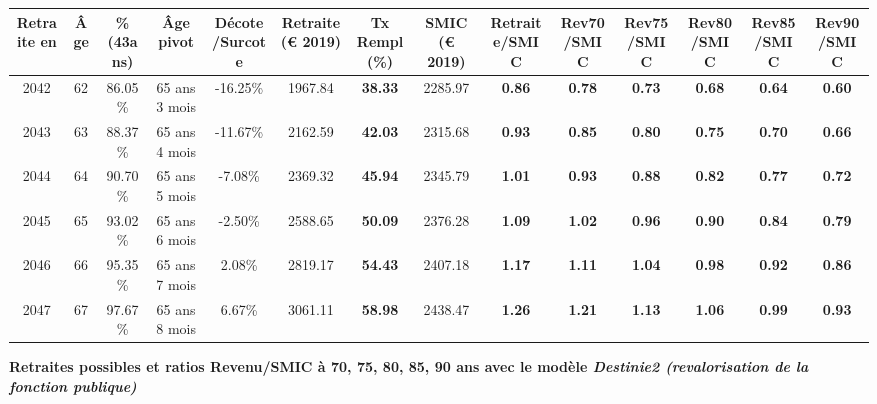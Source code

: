 \begin{adjustbox}{max width=\textwidth} 
\begin{tabular}[htb]{|c|c||c|c|c||c|c||c||c|c|c|c|c|c|} 
\hline 
 Retraite en &  Âge &  \%(43ans) &  Âge pivot &  Décote/Surcote &  Retraite (\euro{} 2019) &  Tx Rempl(\%) &  SMIC (\euro{} 2019) &  Retraite/SMIC &  Rev70/SMIC &  Rev75/SMIC &  Rev80/SMIC &  Rev85/SMIC &  Rev90/SMIC \\ 
\hline \hline 
 2042 &  62 &  86.05\% &  65 ans 3 mois &  -16.25\% &  1967.84 &  {\bf 38.33} &  2285.97 &  {\bf {\color{red} 0.86}} &  {\bf {\color{red} 0.78}} &  {\bf {\color{red} 0.73}} &  {\bf {\color{red} 0.68}} &  {\bf {\color{red} 0.64}} &  {\bf {\color{red} 0.60}} \\ 
\hline 
 2043 &  63 &  88.37\% &  65 ans 4 mois &  -11.67\% &  2162.59 &  {\bf 42.03} &  2315.68 &  {\bf {\color{red} 0.93}} &  {\bf {\color{red} 0.85}} &  {\bf {\color{red} 0.80}} &  {\bf {\color{red} 0.75}} &  {\bf {\color{red} 0.70}} &  {\bf {\color{red} 0.66}} \\ 
\hline 
 2044 &  64 &  90.70\% &  65 ans 5 mois &  -7.08\% &  2369.32 &  {\bf 45.94} &  2345.79 &  {\bf 1.01} &  {\bf {\color{red} 0.93}} &  {\bf {\color{red} 0.88}} &  {\bf {\color{red} 0.82}} &  {\bf {\color{red} 0.77}} &  {\bf {\color{red} 0.72}} \\ 
\hline 
 2045 &  65 &  93.02\% &  65 ans 6 mois &  -2.50\% &  2588.65 &  {\bf 50.09} &  2376.28 &  {\bf 1.09} &  {\bf 1.02} &  {\bf {\color{red} 0.96}} &  {\bf {\color{red} 0.90}} &  {\bf {\color{red} 0.84}} &  {\bf {\color{red} 0.79}} \\ 
\hline 
 2046 &  66 &  95.35\% &  65 ans 7 mois &  2.08\% &  2819.17 &  {\bf 54.43} &  2407.18 &  {\bf 1.17} &  {\bf 1.11} &  {\bf 1.04} &  {\bf {\color{red} 0.98}} &  {\bf {\color{red} 0.92}} &  {\bf {\color{red} 0.86}} \\ 
\hline 
 2047 &  67 &  97.67\% &  65 ans 8 mois &  6.67\% &  3061.11 &  {\bf 58.98} &  2438.47 &  {\bf 1.26} &  {\bf 1.21} &  {\bf 1.13} &  {\bf 1.06} &  {\bf {\color{red} 0.99}} &  {\bf {\color{red} 0.93}} \\ 
\hline 
\hline 
\end{tabular} 
\end{adjustbox} 
 
 \vspace{0.1cm} 
{\bf \noindent Retraites possibles et ratios Revenu/SMIC à 70, 75, 80, 85, 90 ans avec le modèle \emph{Destinie2 (revalorisation de la fonction publique)}}  
 
